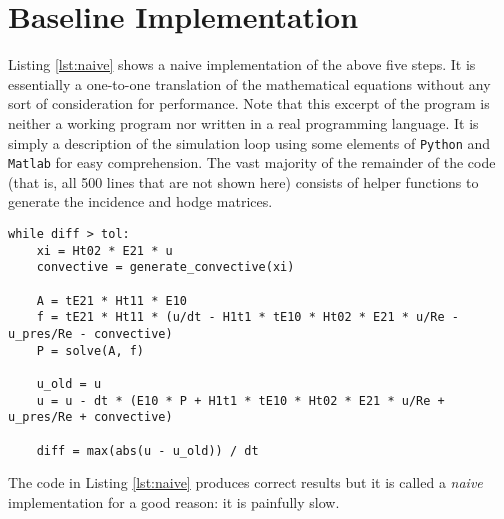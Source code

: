 \section{Baseline Implementation}

Listing \ref{lst:naive} shows a naive implementation of the above five steps. It is essentially a one-to-one translation of the mathematical equations without any sort of consideration for performance. Note that this excerpt of the program is neither a working program nor written in a real programming language. It is simply a description of the simulation loop using some elements of \texttt{Python} and \texttt{Matlab} for easy comprehension. The vast majority of the remainder of the code (that is, all 500 lines that are not shown here) consists of helper functions to generate the incidence and hodge matrices.

\begin{lstlisting}[caption=Code excerpt of a naive implementation., label=lst:naive]
while diff > tol:
    xi = Ht02 * E21 * u
    convective = generate_convective(xi)
    
    A = tE21 * Ht11 * E10
    f = tE21 * Ht11 * (u/dt - H1t1 * tE10 * Ht02 * E21 * u/Re - u_pres/Re - convective)    
    P = solve(A, f)
    
    u_old = u
    u = u - dt * (E10 * P + H1t1 * tE10 * Ht02 * E21 * u/Re + u_pres/Re + convective)
    
    diff = max(abs(u - u_old)) / dt    
\end{lstlisting}

The code in Listing \ref{lst:naive} produces correct results but it is called a \emph{naive} implementation for a good reason: it is painfully slow.
